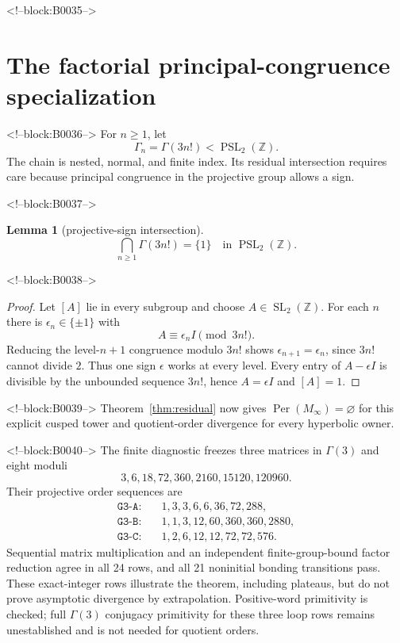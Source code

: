\documentclass[11pt]{article}
\newtheorem{lemma}[theorem]{Lemma}
\theoremstyle{definition}
\theoremstyle{remark}
\newcommand{\ZZ}{\mathbb Z}
\newcommand{\Per}{\operatorname{Per}}
\begin{document}
<!--block:B0035-->
\section{The factorial principal-congruence specialization}

<!--block:B0036-->
For $n\geq1$, let
\[
\Gamma_n=\Gamma(3n!)<\operatorname{PSL}_2(\ZZ).
\]
The chain is nested, normal, and finite index. Its residual intersection requires care because principal congruence in the projective group allows a sign.

<!--block:B0037-->
\begin{lemma}[projective-sign intersection]\label{lem:sign}
\[
\bigcap_{n\geq1}\Gamma(3n!)=\{1\}
\quad\text{in }\operatorname{PSL}_2(\ZZ).
\]
\end{lemma}

<!--block:B0038-->
\begin{proof}
Let $[A]$ lie in every subgroup and choose $A\in\operatorname{SL}_2(\ZZ)$. For each $n$ there is $\epsilon_n\in\{\pm1\}$ with
\[
A\equiv\epsilon_nI\pmod{3n!}.
\]
Reducing the level-$n+1$ congruence modulo $3n!$ shows $\epsilon_{n+1}=\epsilon_n$, since $3n!$ cannot divide $2$. Thus one sign $\epsilon$ works at every level. Every entry of $A-\epsilon I$ is divisible by the unbounded sequence $3n!$, hence $A=\epsilon I$ and $[A]=1$.
\end{proof}

<!--block:B0039-->
Theorem~\ref{thm:residual} now gives $\Per(M_\infty)=\varnothing$ for this explicit cusped tower and quotient-order divergence for every hyperbolic owner.

<!--block:B0040-->
The finite diagnostic freezes three matrices in $\Gamma(3)$ and eight moduli
\[
3,6,18,72,360,2160,15120,120960.
\]
Their projective order sequences are
\begin{align*}
\texttt{G3-A}:&\quad1,3,3,6,6,36,72,288,\\
\texttt{G3-B}:&\quad1,1,3,12,60,360,360,2880,\\
\texttt{G3-C}:&\quad1,2,6,12,12,72,72,576.
\end{align*}
Sequential matrix multiplication and an independent finite-group-bound factor reduction agree in all 24 rows, and all 21 noninitial bonding transitions pass. These exact-integer rows illustrate the theorem, including plateaus, but do not prove asymptotic divergence by extrapolation. Positive-word primitivity is checked; full $\Gamma(3)$ conjugacy primitivity for these three loop rows remains unestablished and is not needed for quotient orders.
\end{document}
